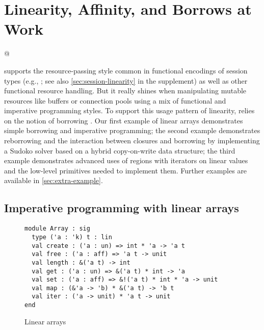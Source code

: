 \section{Linearity, Affinity, and Borrows at Work}
\label{motivation}

\lstMakeShortInline[keepspaces,basicstyle=\small\ttfamily]@

\lang{} supports the resource-passing style
common in functional encodings of session types (e.g.,
\cite{DBLP:journals/jfp/Padovani17}; see also
\cref{sec:session-linearity} in the supplement) as well as other
functional resource handling. But it really shines
when manipulating mutable resources like buffers or connection pools
using a mix of functional and imperative programming styles.
%
To support this usage pattern of linearity, \lang{} relies on
the notion of borrowing \cite{DBLP:conf/popl/BoylandR05}. Our first
example of linear arrays demonstrates simple borrowing and
imperative programming; the second example demonstrates reborrowing
and the interaction between closures and borrowing by implementing a
Sudoko solver based on a hybrid copy-on-write data structure; the
third example demonstrates advanced uses 
of regions with iterators on linear values and the low-level
primitives needed to implement them.
Further examples are available in \cref{sec:extra-example}.

\subsection{Imperative programming with linear arrays}
\label{sec:imper-progr}

\begin{figure}[tp]
  \centering
\begin{lstlisting}[numbers=none]
module Array : sig
  type ('a : 'k) t : lin
  val create : ('a : un) => int * 'a -> 'a t
  val free : ('a : aff) => 'a t -> unit
  val length : &('a t) -> int
  val get : ('a : un) => &('a t) * int -> 'a
  val set : ('a : aff) => &!('a t) * int * 'a -> unit
  val map : (&'a -> 'b) * &('a t) -> 'b t
  val iter : ('a -> unit) * 'a t -> unit
end
\end{lstlisting}
  \vspace{-15pt}
  \caption{Linear arrays}
  \label{ex:array}
  \label{sig:array}
  \vspace{-10pt}
\end{figure}

